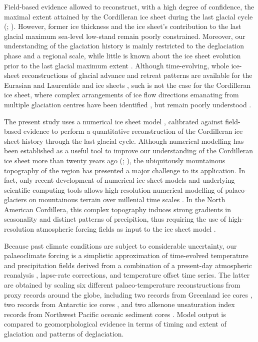 \documentclass[tc, manuscript]{copernicus}
\begin{document}
Field-based evidence allowed to reconstruct, with a high degree of confidence,
the maximal extent attained by the Cordilleran ice sheet during the last
glacial cycle (\citealp[Fig. 1.12]{Clague.1989}; \citealp{Dyke.2004}). However,
former ice thickness
and the ice sheet's contribution to the last glacial maximum sea-level
low-stand remain poorly constrained. Moreover, our understanding of the
glaciation history is mainly restricted to the deglaciation phase and a
regional scale, while little is known about the ice sheet evolution prior to
the last glacial maximum extent \citep[Fig.~6]{Kleman.etal.2010}. Although
time-evolving, whole ice-sheet reconstructions of glacial advance and retreat
patterns are available for the Eurasian and Laurentide and ice sheets
\citep{Kleman.etal.1997, Kleman.etal.2010}, such is not the case for the
Cordilleran ice sheet, where complex arrangements of ice flow directions
emanating from multiple glaciation centres have been identified
\citep[Fig.~1.12]{Prest.etal.1968, Clague.1989}, but remain poorly understood
\citep[p.~2049]{Kleman.etal.2010}.

The present study uses a numerical ice sheet model \citep{PISM-authors.2014},
calibrated against field-based evidence to perform a quantitative
reconstruction of the Cordilleran ice sheet history through the last glacial
cycle. Although numerical modelling has been established as a useful tool to
improve our understanding of the Cordilleran ice sheet more than twenty years
ago (\citealp[p.~227]{Jackson.Clague.1991}; \citealp{Robert.1991}), the
ubiquitously mountainous
topography of the region has presented a major challenge to its application.
In fact, only recent development of numerical ice sheet models and underlying
scientific computing tools \citep{Bueler.Brown.2009, Balay.etal.2014} allows
high-resolution numerical modelling of palaeo-glaciers on mountainous terrain
over millenial time scales \citep{Golledge.etal.2012}. In the North
American Cordillera, this complex topography induces strong gradients in
seasonality and distinct patterns of precipition, thus requiring the use of
high-resolution atmospheric forcing fields as input to the ice sheet model
\citep{Seguinot.etal.2013}.

Because past climate conditions are subject to considerable uncertainty, our
palaeoclimate forcing is a simplistic approximation of time-evolved temperature
and precipitation fields derived from a combination of a present-day
atmospheric reanalysis \citep{Mesinger.etal.2006}, lapse-rate corrections,
and temperature offset time series. The latter are obtained by scaling six
different palaeo-temperature reconstructions from proxy records around the
globe, including two  records from Greenland ice cores
\citep{Dansgaard.etal.1993, Andersen.etal.2004}, two 
records from Antarctic ice cores \citep{Petit.etal.1999,Jouzel.etal.2007},
and two alkenone unsaturation index records from Northwest Pacific oceanic
sediment cores \citep{Herbert.etal.2001}. Model output is compared to
geomorphological evidence in terms of timing and extent of glaciation and
patterns of deglaciation.
\end{document}
